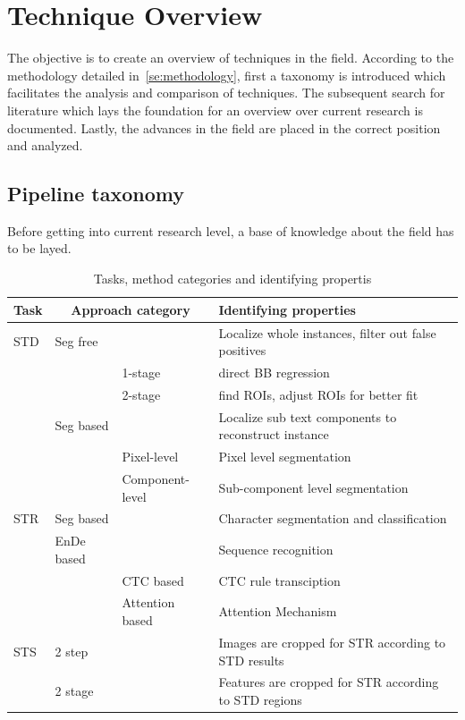 \chapter{Technique Overview}\label{ch:research}
The objective is to create an overview of techniques in the field.
According to the methodology detailed in~\ref{se:methodology}, first a taxonomy is introduced
which facilitates the analysis and comparison of techniques.
The subsequent search for literature which lays the foundation for an overview over current research
is documented.
Lastly, the advances in the field are placed in the correct position and analyzed.

\section{Pipeline taxonomy}\label{se:taxonomy}
Before getting into current research level, a base of knowledge about the field has to be layed.
\begin{table}[h]
    \centering\scriptsize
    \begin{tabular}{p{}p{}p{}p{}}
        Task & \multicolumn{2}{c}{Approach category} & Identifying properties \\
        \toprule
        STD & Seg free & & Localize whole instances, filter out false positives \\
            & & 1-stage & direct BB regression \\
            & & 2-stage & find ROIs, adjust ROIs for better fit \\
            & Seg based & & Localize sub text components to reconstruct instance \\
            & & Pixel-level & Pixel level segmentation \\
            & & Component-level & Sub-component level segmentation \\
        \midrule
        STR & Seg based & & Character segmentation and classification\\
            & \ac{EnDe} based & & Sequence recognition \\
            & & CTC based & CTC rule transciption \\
            & & Attention based & Attention Mechanism \\
        \midrule
        STS & 2 step & & Images are cropped for STR according to STD results \\
            & 2 stage & & Features are cropped for STR according to STD regions \\
        \bottomrule
    \end{tabular}
    \caption{Tasks, method categories and identifying propertis\label{tb:steps-properties}}
\end{table}
